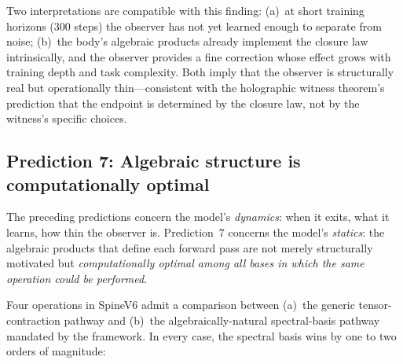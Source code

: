 \documentclass[11pt,a4paper]{article}
\theoremstyle{plain}
\theoremstyle{definition}
\theoremstyle{remark}
\numberwithin{equation}{section}
\begin{document}
Two interpretations are compatible with this finding: (a)~at short
training horizons ($300$ steps) the observer has not yet learned
enough to separate from noise; (b)~the body's algebraic
products already implement the closure law intrinsically, and the
observer provides a fine correction whose effect grows with
training depth and task complexity.  Both imply that the observer is
structurally real but operationally thin---consistent with the
holographic witness theorem's prediction that the endpoint is
determined by the closure law, not by the witness's specific
choices.

\subsection{Prediction 7: Algebraic structure is computationally optimal}

The preceding predictions concern the model's \emph{dynamics}:
when it exits, what it learns, how thin the observer is.
Prediction~7 concerns the model's \emph{statics}: the algebraic
products that define each forward pass are not merely structurally
motivated but \emph{computationally optimal among all bases in
which the same operation could be performed}.

Four operations in SpineV6 admit a comparison between (a)~the
generic tensor-contraction pathway and (b)~the
algebraically-natural spectral-basis pathway mandated by the
framework.  In every case, the spectral basis wins by one to two
orders of magnitude:
\end{document}

